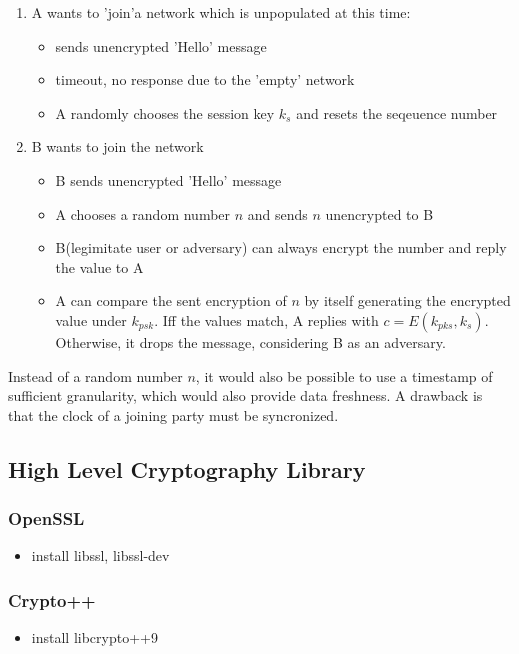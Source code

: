 \begin{enumerate}
 \item A wants to 'join'a network which is unpopulated at this time:
\begin{itemize}
 \item sends unencrypted 'Hello' message
 \item timeout, no response due to the 'empty' network
 \item A randomly chooses the session key $k_s$ and resets the seqeuence number
\end{itemize}
\item B wants to join the network
\begin{itemize}
 \item B sends unencrypted 'Hello' message
 \item A chooses a random number $n$ and sends $n$ unencrypted to  B
 \item B(legimitate user or adversary) can always encrypt the number and reply the value to A
 \item A can compare the sent encryption of $n$ by itself generating the encrypted value under $k_{psk}$. Iff the
 values match, A replies with $c = E(k_{pks}, k_s)$. Otherwise, it drops the message, considering B as an adversary.
\end{itemize}
\end{enumerate}

Instead of a random number $n$, it would also be possible to use a timestamp of sufficient granularity, which would also provide data freshness.
A drawback is that the clock of a joining party must be syncronized.

\subsection{High Level Cryptography Library}

\subsubsection{OpenSSL}

\begin{itemize}
 \item install libssl, libssl-dev
\end{itemize}

\subsubsection{Crypto++}
\begin{itemize}
 \item install  libcrypto++9
\end{itemize}